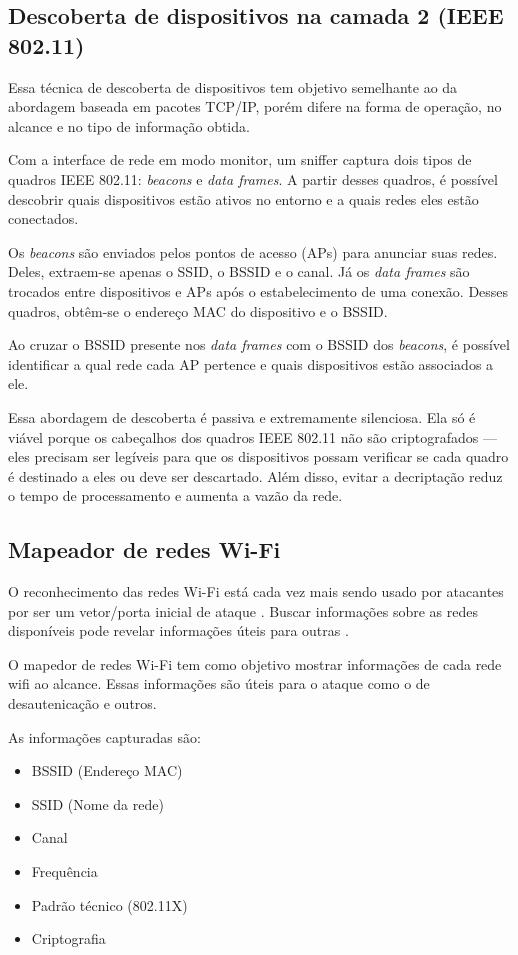 \subsection{\textbf{Descoberta de dispositivos na camada 2 (IEEE 802.11)}}

Essa técnica de descoberta de dispositivos tem objetivo semelhante ao da abordagem baseada em pacotes TCP/IP, porém difere na forma de operação, no alcance e no tipo de informação obtida.

Com a interface de rede em modo monitor, um sniffer captura dois tipos de quadros IEEE 802.11: \textit{beacons} e \textit{data frames}. A partir desses quadros, é possível descobrir quais dispositivos estão ativos no entorno e a quais redes eles estão conectados.

Os \textit{beacons} são enviados pelos pontos de acesso (APs) para anunciar suas redes. Deles, extraem-se apenas o SSID, o BSSID e o canal. Já os \textit{data frames} são trocados entre dispositivos e APs após o estabelecimento de uma conexão. Desses quadros, obtêm-se o endereço MAC do dispositivo e o BSSID.

Ao cruzar o BSSID presente nos \textit{data frames} com o BSSID dos \textit{beacons}, é possível identificar a qual rede cada AP pertence e quais dispositivos estão associados a ele.

Essa abordagem de descoberta é passiva e extremamente silenciosa. Ela só é viável porque os cabeçalhos dos quadros IEEE 802.11 não são criptografados — eles precisam ser legíveis para que os dispositivos possam verificar se cada quadro é destinado a eles ou deve ser descartado. Além disso, evitar a decriptação reduz o tempo de processamento e aumenta a vazão da rede.



\subsection{\textbf{Mapeador de redes Wi-Fi}}
O reconhecimento das redes Wi-Fi está cada vez mais sendo usado por atacantes por ser um vetor/porta inicial de ataque \cite{wifi-vec}. Buscar informações sobre as redes disponíveis pode revelar informações úteis para outras .

O mapedor de redes Wi-Fi tem como objetivo mostrar informações de cada rede wifi ao alcance. Essas informações são úteis para o ataque como o de desautenicação e outros.

As informações capturadas são:
\begin{itemize}
    \item BSSID (Endereço MAC)
    \item SSID (Nome da rede)
    \item Canal
    \item Frequência
    \item Padrão técnico (802.11X)
    \item Criptografia
\end{itemize}

